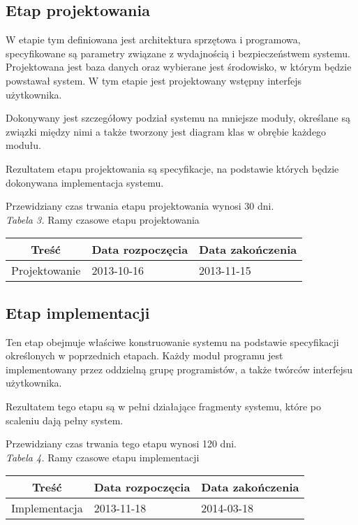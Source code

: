 \documentclass 	[11pt, a4paper, leqno]	{article}					%
\begin{document}
\subsection{Etap projektowania}
\noindent
W etapie tym definiowana jest architektura sprzętowa i programowa, specyfikowane są parametry związane z wydajnością i bezpieczeństwem systemu. Projektowana jest baza danych oraz wybierane jest środowisko, w którym będzie powstawał system. W tym etapie jest projektowany wstępny interfejs użytkownika. 

Dokonywany jest szczegółowy podział systemu na mniejsze moduły, określane są związki między nimi a także tworzony jest diagram klas w obrębie każdego modułu.

Rezultatem etapu projektowania są specyfikacje, na podstawie których będzie dokonywana implementacja systemu. 

Przewidziany czas trwania etapu projektowania wynosi 30 dni. \\

\textit{Tabela 3.} Ramy czasowe etapu projektowania

\begin{center}
	\begin{tabular}{| l | l | l |}
		\hline
		\multicolumn{1}{|c|}{Treść} & 
		\multicolumn{1}{|c|}{Data rozpoczęcia} & 
		\multicolumn{1}{|c|}{Data zakończenia} \\ \hline \hline
		Projektowanie & 2013-10-16 & 2013-11-15 \\ \hline
	\end{tabular}
\end{center}

\subsection{Etap implementacji}
\noindent
Ten etap obejmuje właściwe konstruowanie systemu na podstawie specyfikacji określonych w poprzednich etapach. Każdy moduł programu jest implementowany przez oddzielną grupę programistów, a także twórców interfejsu użytkownika. 

Rezultatem tego etapu są w pełni działające fragmenty systemu, które po scaleniu dają pełny system.

Przewidziany czas trwania tego etapu wynosi 120 dni. \\

\textit{Tabela 4.} Ramy czasowe etapu implementacji

\begin{center}
	\begin{tabular}{| l | l | l |}
		\hline
		\multicolumn{1}{|c|}{Treść} & 
		\multicolumn{1}{|c|}{Data rozpoczęcia} & 
		\multicolumn{1}{|c|}{Data zakończenia} \\ \hline \hline
		Implementacja & 2013-11-18 & 2014-03-18 \\ \hline
	\end{tabular}
\end{center}
\end{document}
